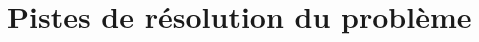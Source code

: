 \documentclass{article}
\begin{document}

\section{Pistes de résolution du problème}



\end{document}
